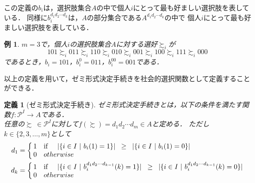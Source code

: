 \documentclass[dvipdfmx]{jsarticle}
\newtheorem{definition}{定義}
\newtheorem{example}{例}
\begin{document}
この定義の$b_i$は，選択肢集合$A$の中で個人$i$にとって最も好ましい選択肢を表している．
同様に$b_{i}^{d_{1}d_{2}\cdots d_{k}}$は，$A$の部分集合である$A^{d_{1}d_{2}\cdots d_{k}}$の中で
個人$i$にとって最も好ましい選択肢を表している．

\begin{example}
  $m=3$で，個人$i$の選択肢集合$A$に対する選好$\succsim_i$が
  \[
    101 \succsim_i 011 \succsim_i 110 \succsim_i 010 \succsim_i 001 \succsim_i 100
    \succsim_i 111 \succsim_i 000
  \]
  であるとき，$b_i = 101$，$b_{i}^{0} = 011$，$b_{i}^{00} = 001$である．
\end{example}

以上の定義を用いて，ゼミ形式決定手続きを社会的選択関数として定義することができる．
\begin{definition}[ゼミ形式決定手続き]
  ゼミ形式決定手続きとは，以下の条件を満たす関数$f\colon \mathcal{P}^I \to A$である．\\
  任意の$\succsim \ \in \mathcal{P}^I$に対して$f(\succsim) = d_{1}d_{2}\cdots d_{m} \in A$と定める．
  ただし$k \in \{2,3,\ldots,m\}$として
  \begin{align*}
      d_{1}
    &= \left\{ \begin{array}{@{\,}rl@{}}
      1 & \mbox{if}\hspace{5mm}  |\{i \in I\ |\ b_i(1) = 1\}| \hspace{2mm} \geq \hspace{2mm} |\{i \in I\ |\ b_i(1) = 0\}| \\
      0 & otherwise
    \end{array} \right. \\
      d_{k}
    &= \left\{ \begin{array}{@{\,}rl@{}}
      1 & \mbox{if}\hspace{5mm}  |\{i \in I\ |\ b_i^{d_{1}d_{2}\cdots d_{k-1}}(k) = 1\}| \hspace{2mm}
      \geq \hspace{2mm} |\{i \in I\ |\ b_i^{d_{1}d_{2}\cdots d_{k-1}}(k) = 0\}| \\
      0 & otherwise
    \end{array} \right.
  \end{align*}
\end{definition}
\end{document}
